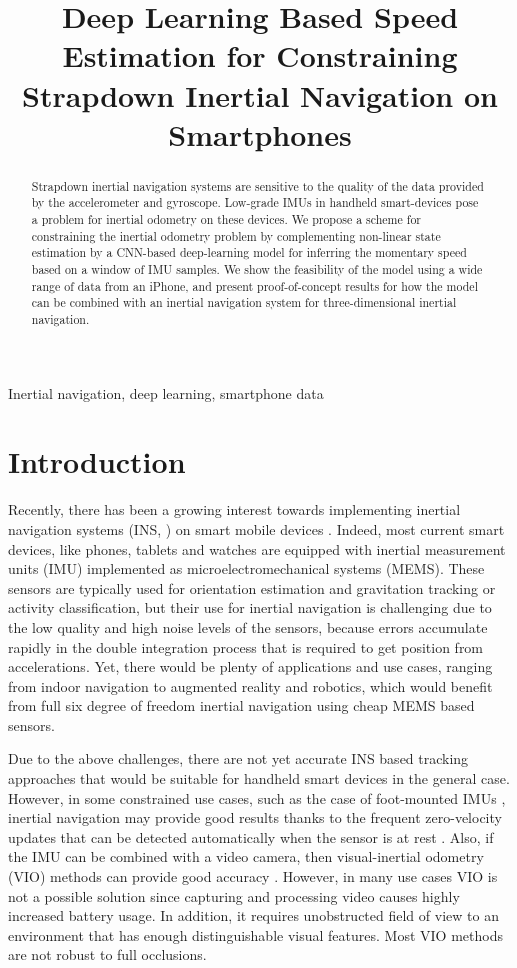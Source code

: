 \documentclass{article}
\title{Deep Learning Based Speed Estimation for Constraining Strapdown Inertial Navigation on Smartphones}
\begin{document}
\maketitle
\begin{abstract}
  Strapdown inertial navigation systems are sensitive to the quality of the data provided by the accelerometer and gyroscope. Low-grade IMUs in handheld smart-devices pose a problem for inertial odometry on these devices. We propose a scheme for constraining the inertial odometry problem by complementing non-linear state estimation by a CNN-based deep-learning model for inferring the momentary speed based on a window of IMU samples. We show the feasibility of the model using a wide range of data from an iPhone, and present proof-of-concept results for how the model can be combined with an inertial navigation system for three-dimensional inertial navigation.
\end{abstract}
\begin{keywords}
  Inertial navigation, deep learning, smartphone data
\end{keywords}
\section{Introduction}
\label{sec:intro}

Recently, there has been a growing interest towards implementing inertial navigation systems (INS, \cite{Jekeli:2001,Britting:2010}) on smart mobile devices \cite{Solin+Cortes+Rahtu+Kannala, Yan+Shan+Furukawa:2017, Chen+Lu+Markham+Trigoni:2018}. Indeed, most current smart devices, like phones, tablets and watches are equipped with inertial measurement units (IMU) implemented as microelectromechanical systems (MEMS). These sensors are typically used for orientation estimation and gravitation tracking \cite{Sarkka+Tolvanen+Kannala+Rahtu:2015} or activity classification, but their use for inertial navigation is challenging due to the low quality and high noise levels of the sensors, because errors accumulate rapidly in the double integration process that is required to get position from accelerations. Yet, there would be plenty of applications and use cases, ranging from indoor navigation to augmented reality and robotics, which would benefit from full six degree of freedom inertial navigation using cheap MEMS based sensors.

Due to the above challenges, there are not yet accurate INS based tracking approaches that would be suitable for handheld smart devices in the general case. However, in some constrained use cases, such as the case of foot-mounted IMUs \cite{Foxlin:2005}, inertial navigation may provide good results thanks to the frequent zero-velocity updates that can be detected automatically when the sensor is at rest \cite{Nilsson+Gupta+Handel:2014}. Also, if the IMU can be combined with a video camera, then visual-inertial odometry (VIO) methods can provide good accuracy \cite{Solin+Cortes+Rahtu+Kannala:2018, maplab}. However, in many use cases VIO is not a possible solution since capturing and processing video causes highly increased battery usage. In addition, it requires unobstructed field of view to an environment that has enough distinguishable visual features. Most VIO methods are not robust to full occlusions.
\end{document}
